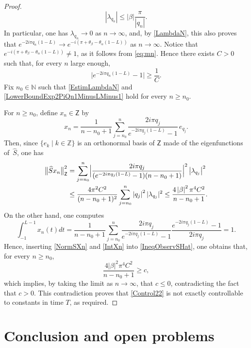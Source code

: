 \documentclass[JEP,XML,SOM,Unicode]{cedram}
\theoremstyle{plain}
\theoremstyle{definition}
\newcommand{\abs}[1]{\left\lvert #1\right \rvert}
\newcommand{\bnorm}[1]{\bigl\lVert #1\bigr\lVert}
\newcommand{\babs}[1]{\bigl\lvert #1\bigr \rvert}
\newcommand{\Babs}[1]{\Bigl\lvert #1\Bigr \rvert}
\newcommand{\nabs}[1]{\lvert #1 \rvert}
\begin{document}
\begin{proof}
\begin{equation}
\abs{\lambda_{q_n}} \leq \abs{\beta} \frac{\pi}{\abs{q_n}}.
\end{equation}
In particular, one has $\lambda_{q_n} \to 0$ as $n \to \infty$, and, by \eqref{LambdaN}, this also proves that $e^{- 2 i \pi q_n (1 - L)} \to e^{-i(\pi + \theta_\beta - \theta_\alpha(1 - L))}$ as $n \to \infty$. Notice that $e^{-i(\pi + \theta_\beta - \theta_\alpha(1 - L))} \neq 1$, as it follows from \eqref{eq:mn}. Hence there exists $C > 0$ such that, for every $n$ large enough,
\begin{equation}
\label{LowerBoundExp2PiQn1MinusLMinus1}
\babs{e^{- 2 i \pi q_n (1 - L)} - 1} \geq \frac{1}{C}.
\end{equation}
Fix $n_0 \in \mathbb N$ such that \eqref{EstimLambdaN} and \eqref{LowerBoundExp2PiQn1MinusLMinus1} hold for every $n \geq n_0$.

For $n \geq n_0$, define $x_n \in \mathsf Z$ by
\[
x_n = \frac{1}{n - n_0 + 1} \sum_{j = n_0}^n \frac{2 i \pi q_j}{e^{- 2 i \pi q_j (1 - L)} - 1}\, e_{q_j}.
\]
Then, since $\{e_k \mid k \in \mathbb Z\}$ is an orthonormal basis of $\mathsf Z$ made of the eigenfunctions of~$\widehat S$, one has
\begin{equation}
\label{NormSXn}
\begin{aligned}
\bnorm{\widehat S x_n}_{\mathsf Z}^2 & = \sum_{j = n_0}^n \Babs{\frac{2 i \pi q_j}{(e^{- 2 i \pi q_j (1 - L)} - 1)(n - n_0 + 1)}}^2 \abs{\lambda_{q_j}}^2 \\
& \leq \frac{4 \pi^2 C^2}{(n - n_0 + 1)^2} \sum_{j = n_0}^n \abs{q_j}^2 \nabs{\lambda_{q_j}}^2 \leq \frac{4 \abs{\beta}^2 \pi^4 C^2}{n - n_0 + 1}.
\end{aligned}
\end{equation}
On the other hand, one computes
\begin{equation}
\label{IntXn}
\int_{-1}^{L - 1} x_n(t) dt = \frac{1}{n - n_0 + 1} \sum_{j = n_0}^n \frac{2 i \pi q_j}{e^{- 2 i \pi q_j (1 - L)} - 1} \frac{e^{- 2 i \pi q_j (1 - L)} - 1}{2 i \pi q_j} = 1.
\end{equation}
Hence, inserting \eqref{NormSXn} and \eqref{IntXn} into \eqref{IneqObservSHat}, one obtains that, for every $n \geq n_0$,
\[
\frac{4 \abs{\beta}^2 \pi^4 C^2}{n - n_0 + 1} \geq c,
\]
which implies, by taking the limit as $n \to \infty$, that $c \leq 0$, contradicting the fact that $c > 0$. This contradiction proves that \eqref{Control22} is not exactly controllable to constants in time $T$, as required.
\end{proof}

\section{Conclusion and open problems}
\end{document}
